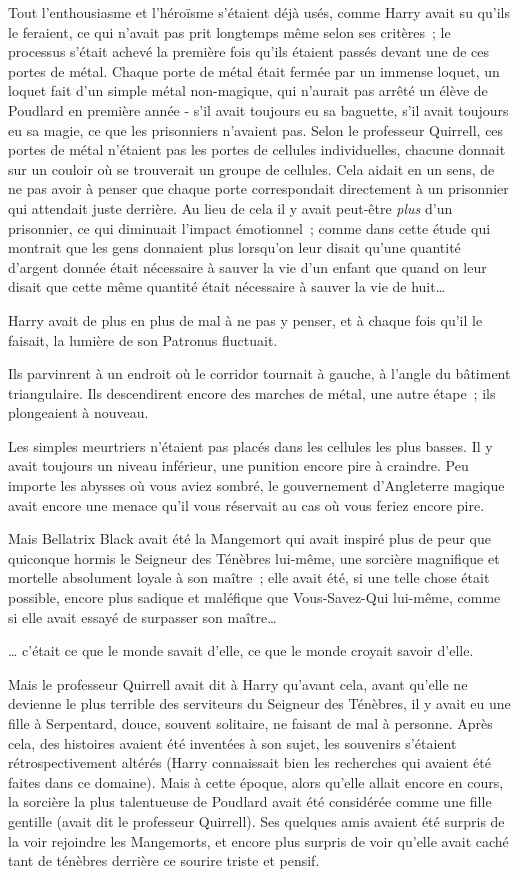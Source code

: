 Tout l'enthousiasme et l'héroïsme s'étaient déjà usés, comme Harry avait su qu'ils le feraient, ce qui n'avait pas prit longtemps même selon ses critères~; le processus s'était achevé la première fois qu'ils étaient passés devant une de ces portes de métal. Chaque porte de métal était fermée par un immense loquet, un loquet fait d'un simple métal non-magique, qui n'aurait pas arrêté un élève de Poudlard en première année - s'il avait toujours eu sa baguette, s'il avait toujours eu sa magie, ce que les prisonniers n'avaient pas. Selon le professeur Quirrell, ces portes de métal n'étaient pas les portes de cellules individuelles, chacune donnait sur un couloir où se trouverait un groupe de cellules. Cela aidait en un sens, de ne pas avoir à penser que chaque porte correspondait directement à un prisonnier qui attendait juste derrière. Au lieu de cela il y avait peut-être \emph{plus} d'un prisonnier, ce qui diminuait l'impact émotionnel~; comme dans cette étude qui montrait que les gens donnaient plus lorsqu'on leur disait qu'une quantité d'argent donnée était nécessaire à sauver la vie d'un enfant que quand on leur disait que cette même quantité était nécessaire à sauver la vie de huit…

Harry avait de plus en plus de mal à ne pas y penser, et à chaque fois qu'il le faisait, la lumière de son Patronus fluctuait.

Ils parvinrent à un endroit où le corridor tournait à gauche, à l'angle du bâtiment triangulaire. Ils descendirent encore des marches de métal, une autre étape~; ils plongeaient à nouveau.

Les simples meurtriers n'étaient pas placés dans les cellules les plus basses. Il y avait toujours un niveau inférieur, une punition encore pire à craindre. Peu importe les abysses où vous aviez sombré, le gouvernement d'Angleterre magique avait encore une menace qu'il vous réservait au cas où vous feriez encore pire.

Mais Bellatrix Black avait été la Mangemort qui avait inspiré plus de peur que quiconque hormis le Seigneur des Ténèbres lui-même, une sorcière magnifique et mortelle absolument loyale à son maître~; elle avait été, si une telle chose était possible, encore plus sadique et maléfique que Vous-Savez-Qui lui-même, comme si elle avait essayé de surpasser son maître…

… c'était ce que le monde savait d'elle, ce que le monde croyait savoir d'elle.

Mais le professeur Quirrell avait dit à Harry qu'avant cela, avant qu'elle ne devienne le plus terrible des serviteurs du Seigneur des Ténèbres, il y avait eu une fille à Serpentard, douce, souvent solitaire, ne faisant de mal à personne. Après cela, des histoires avaient été inventées à son sujet, les souvenirs s'étaient rétrospectivement altérés (Harry connaissait bien les recherches qui avaient été faites dans ce domaine). Mais à cette époque, alors qu'elle allait encore en cours, la sorcière la plus talentueuse de Poudlard avait été considérée comme une fille gentille (avait dit le professeur Quirrell). Ses quelques amis avaient été surpris de la voir rejoindre les Mangemorts, et encore plus surpris de voir qu'elle avait caché tant de ténèbres derrière ce sourire triste et pensif.

